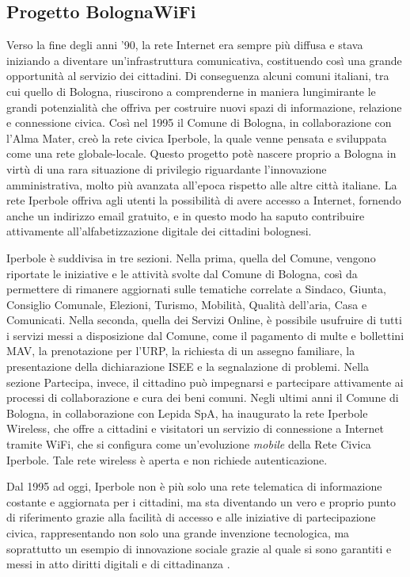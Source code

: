 \subsection{Progetto BolognaWiFi}
Verso la fine degli anni '90, la rete Internet era sempre più diffusa e stava iniziando a diventare un'infrastruttura comunicativa, costituendo così una grande opportunità al servizio dei cittadini. Di conseguenza alcuni comuni italiani, tra cui quello di Bologna, riuscirono a comprenderne in maniera lungimirante le grandi potenzialità che offriva per costruire nuovi spazi di informazione, relazione e connessione civica.
Così nel 1995 il Comune di Bologna, in collaborazione con l'Alma Mater, creò la rete civica Iperbole, la quale venne pensata e sviluppata come una rete globale-locale. Questo progetto potè nascere proprio a Bologna in virtù di una rara situazione di privilegio riguardante l'innovazione amministrativa, molto più avanzata all'epoca rispetto alle altre città italiane.
La rete Iperbole offriva agli utenti la possibilità di avere accesso a Internet, fornendo anche un indirizzo email gratuito, e in questo modo ha saputo contribuire attivamente all'alfabetizzazione digitale dei cittadini bolognesi.

Iperbole è suddivisa in tre sezioni. Nella prima, quella del Comune, vengono riportate le iniziative e le attività svolte dal Comune di Bologna, così da permettere di rimanere aggiornati sulle tematiche correlate a Sindaco, Giunta, Consiglio Comunale, Elezioni, Turismo, Mobilità, Qualità dell'aria, Casa e Comunicati.
Nella seconda, quella dei Servizi Online, è possibile usufruire di tutti i servizi messi a disposizione dal Comune, come il pagamento di multe e bollettini MAV, la prenotazione per l'URP, la richiesta di un assegno familiare, la presentazione della dichiarazione ISEE e la segnalazione di problemi.
Nella sezione Partecipa, invece, il cittadino può impegnarsi e partecipare attivamente ai processi di collaborazione e cura dei beni comuni.
Negli ultimi anni il Comune di Bologna, in collaborazione con Lepida SpA, ha inaugurato la rete Iperbole Wireless, che offre a cittadini e visitatori un servizio di connessione a Internet tramite WiFi, che si configura come un'evoluzione \textit{mobile} della Rete Civica Iperbole. Tale rete wireless è aperta e non richiede autenticazione.

Dal 1995 ad oggi, Iperbole non è più solo una rete telematica di informazione costante e aggiornata per i cittadini, ma sta diventando un vero e proprio punto di riferimento grazie alla facilità di accesso e alle iniziative di partecipazione civica, rappresentando non solo una grande invenzione tecnologica, ma soprattutto un esempio di innovazione sociale grazie al quale si sono garantiti e messi in atto diritti digitali e di cittadinanza \cite{Iperbole_Citta_Connessa}.

